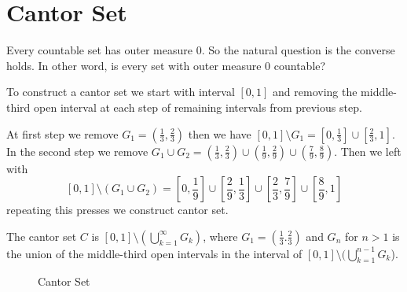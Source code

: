 \section{Cantor Set}
Every countable set has outer measure $0$. So the natural question is the converse holds. In other word, is every set with outer measure  $0$ countable?

To construct a cantor set we start with interval $[0,1]$ and removing the middle-third open interval at each step of remaining intervals from previous step.

At first step we remove  $G_1=(\frac{1}{3},\frac{2}{3})$ then we have $[0,1]\setminus G_1=[0,\frac{1}{3}]\cup[\frac{2}{3},1]$.\\
In the second step we remove $G_1\cup G_2=(\frac{1}{3},\frac{2}{3})\cup(\frac{1}{9},\frac{2}{9})\cup(\frac{7}{9},\frac{8}{9})$. Then we left with 
\[
    \left[ 0,1 \right]\setminus (G_1\cup G_2) = \left[0,\frac{1}{9}\right]\cup\left[ \frac{2}{9},\frac{1}{3} \right] \cup \left[ \frac{2}{3},\frac{7}{9} \right] \cup\left[ \frac{8}{9},1\right] 
\]
repeating this presses we construct cantor set.

\begin{definition}
    The cantor set $C$ is  $[0,1]\setminus (\bigcup_{k=1}^{\infty}G_k)$, where $G_1=(\frac{1}{3}.\frac{2}{3})$ and $G_n$ for  $n>1$ is the union of the middle-third
    open intervals in the interval of  $[0,1]\setminus (\bigcup_{k=1}^{n-1}G_k$).
\end{definition}
\begin{figure}[!h]
    \centering
    \caption{Cantor Set}
\end{figure}

